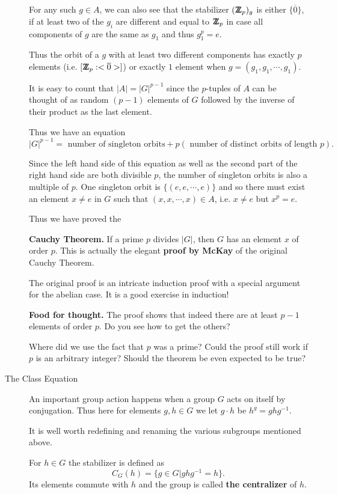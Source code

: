 \documentclass[12pt]{article}
\def\DZ{ \mbox{\rm Z \kern -0.75em Z} }
\begin{document}
\begin{description}
For any such $g\in A$, we can also see that the stabilizer $(\DZ_p)_g$
is either $\{\overline{0}\}$, if at least two of the $g_i$ are different and
equal to $\DZ_p$ in case all components of $g$ are the same as $g_1$
and thus $g_1^p=e$.

Thus the orbit of a $g$ with at least two different components has
exactly $p$ elements (i.e. $[\DZ_p:<\overline{0}>]$) or exactly $1$
element when $g=(g_1,g_1,\cdots,g_1)$.

It is easy to count that $|A|=|G|^{p-1}$ since the $p$-tuples of $A$ can
be thought of as random $(p-1)$ elements of $G$ followed by the inverse
of their product as the last element.

Thus we have an equation 
$$|G|^{p-1} = \mbox{ number of singleton orbits} + p(\mbox{ number of
distinct orbits of length $p$}).$$

Since the left hand side of this equation as well as the second part of
the right hand side are both divisible $p$, the number of singleton
orbits is also a multiple of $p$. One singleton orbit is
$\{(e,e,\cdots,e)\}$ and so there must exist an element $x\neq e $ in
$G$ such that $(x,x,\cdots,x)\in A$, i.e. $x\neq e$ but $x^p=e$.

Thus we have proved the

{\bf Cauchy Theorem.} If a prime $p$ divides $|G|$, then $G$ has an
element $x$ of order $p$.
This is actually the elegant {\bf proof by McKay} of the original Cauchy
Theorem.

The original proof is an intricate induction proof with a special
argument for the abelian case. It is a good exercise in induction!

{\bf Food for thought.} The proof shows that indeed there are at least
$p-1$ elements of order $p$. Do you see how to get the others?

Where did we use the fact that $p$ was a prime? Could the proof still
work if $p$ is an arbitrary integer? Should the theorem be even expected
to be true?

\item[The Class Equation]
An important group action happens when a group $G$ acts on itself by
conjugation. Thus here for elements $g,h\in G$ we let  $g\cdot h$ be 
$h^g = ghg^{-1}$.

It is well worth redefining and renaming the various subgroups mentioned
above.

For $h\in G$ the stabilizer is defined as 
$$C_G(h) = \{ g\in G | ghg^{-1}=h\}.$$
Its elements commute with $h$ and the group is called {\bf the centralizer} of $h$. 


\end{description}
\end{document}
